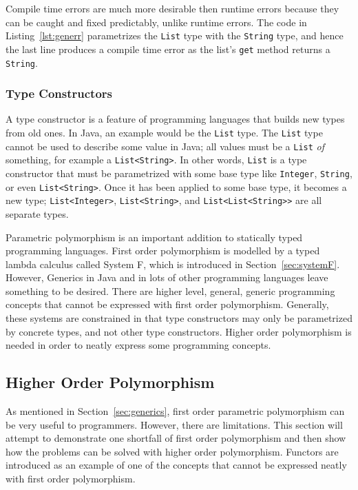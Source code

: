 Compile time errors are much more desirable then runtime errors because they
can be caught and fixed predictably, unlike runtime errors.  The code in
Listing~\ref{lst:generr} parametrizes the \lstinline{List} type with the
\lstinline{String} type, and hence the last line produces a compile time error
as the list's \lstinline{get} method returns a \lstinline{String}. 

\subsubsection{Type Constructors}
A type constructor is a feature of programming languages that builds new types
from old ones. In Java, an example would be the \lstinline{List} type. The
\lstinline{List} type cannot be used to describe some value in Java; all values
must be a \lstinline{List} \textit{of} something, for example a
\lstinline{List<String>}.  In other words, \lstinline{List} is a type
constructor that must be parametrized with some base type like
\lstinline{Integer}, \lstinline{String}, or even \lstinline{List<String>}. Once
it has been applied to some base type, it becomes a new type;
\lstinline{List<Integer>}, \lstinline{List<String>}, and
\lstinline{List<List<String>>} are all separate types.

Parametric polymorphism is an important addition to statically typed
programming languages. First order polymorphism is modelled by a typed lambda
calculus called System F, which is introduced in Section~\ref{sec:systemF}.
However, Generics in Java and in lots of other programming languages leave
something to be desired.  There are higher level, general, generic programming
concepts that cannot be expressed with first order polymorphism. Generally,
these systems are constrained in that type constructors may only be
parametrized by concrete types, and not other type constructors. Higher order
polymorphism is needed in order to neatly express some programming concepts.

\subsection{Higher Order Polymorphism}
As mentioned in Section~\ref{sec:generics}, first order parametric polymorphism
can be very useful to programmers.  However, there are limitations. This
section will attempt to demonstrate one shortfall of first order polymorphism
and then show how the problems can be solved with higher order polymorphism.
Functors are introduced as an example of one of the concepts that cannot be
expressed neatly with first order polymorphism.

